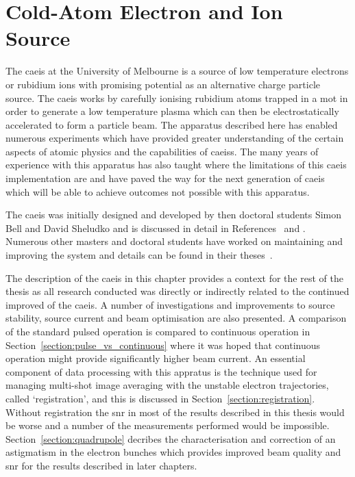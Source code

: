 \chapter{Cold-Atom Electron and Ion Source}\label{chapter:setup}

The \gls{caeis} at the University of Melbourne is a source of low temperature electrons or rubidium ions with promising potential as an alternative charge particle source.
The \gls{caeis} works by carefully ionising rubidium atoms trapped in a \gls{mot} in order to generate a low temperature plasma which can then be electrostatically accelerated to form a particle beam.
The apparatus described here has enabled numerous experiments which have provided greater understanding of the certain aspects of atomic physics and the capabilities of \glspl{caeis}.
The many years of experience with this apparatus has also taught where the limitations of this \gls{caeis} implementation are and have paved the way for the next generation of \gls{caeis} which will be able to achieve outcomes not possible with this apparatus.

The \gls{caeis} was initially designed and developed by then doctoral students Simon Bell and David Sheludko and is discussed in detail in References~\cite{sheludko_shaped_2010} and \cite{bell_cold_2011}.
Numerous other masters and doctoral students have worked on maintaining and improving the system and details can be found in their theses~\cite{saliba_cold_2011,mcculloch_generation_2013,taylor_rydberg_2013,tielen_development_2015,murphy_measurement_2017,speirs_electron_2017}.

The description of the \gls{caeis} in this chapter provides a context for the rest of the thesis as all research conducted was directly or indirectly related to the continued improved of the \gls{caeis}. A number of investigations and improvements to source stability, source current and beam optimisation are also presented.
A comparison of the standard pulsed operation is compared to continuous operation in Section~\ref{section:pulse_vs_continuous} where it was hoped that continuous operation might provide significantly higher beam current.
An essential component of data processing with this appratus is the technique used for managing multi-shot image averaging with the unstable electron trajectories, called `registration', and this is discussed in Section~\ref{section:registration}.
Without registration the \gls{snr} in most of the results described in this thesis would be worse and a number of the measurements performed would be impossible.
Section~\ref{section:quadrupole} decribes the characterisation and correction of an astigmatism in the electron bunches which provides improved beam quality and \gls{snr} for the results described in later chapters.

